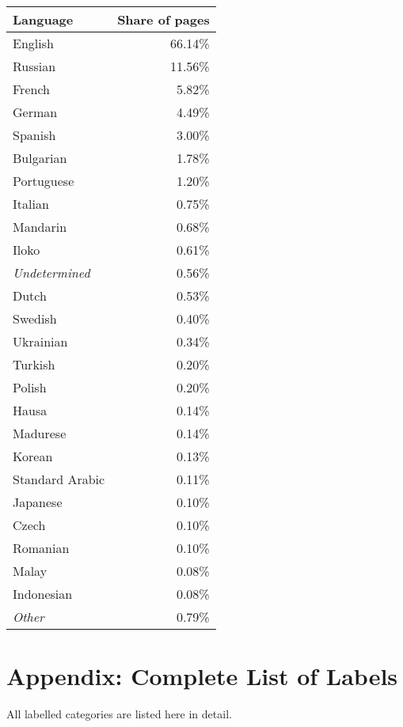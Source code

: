 \begin{center}
    \label{table:languages}
    \begin{tabular*}{\textwidth}{l@{\extracolsep{\fill}}r}
    \textbf{Language} &	\textbf{Share of pages}	\\
    \hline
    \hline
	English		&	66.14\%\\
	\hline
	Russian		&	11.56\%\\
	\hline
	French		&	5.82\%\\
	\hline
	German		&	4.49\%\\
	\hline
	Spanish		&	3.00\%\\
	\hline
	Bulgarian	&	1.78\%\\
	\hline
	Portuguese	&	1.20\%\\
	\hline
	Italian	&	0.75\%\\
	\hline
	Mandarin	&	0.68\%\\
	\hline
	Iloko		&	0.61\%\\
	\hline
	\textit{Undetermined}	&	0.56\%\\
	\hline
	Dutch		&	0.53\%\\
	\hline
	Swedish		&	0.40\%\\
	\hline
	Ukrainian	&	0.34\%\\
	\hline
	Turkish		&	0.20\%\\
	\hline
	Polish		&	0.20\%\\
	\hline
	Hausa		&	0.14\%\\
	\hline
	Madurese	&	0.14\%\\
	\hline
	Korean		&	0.13\%\\
	\hline
	Standard Arabic	&	0.11\%\\
	\hline
	Japanese	&	0.10\%\\
	\hline
	Czech		&	0.10\%\\
	\hline
	Romanian	&	0.10\%\\
	\hline
	Malay		&	0.08\%\\
	\hline
	Indonesian	&	0.08\%\\
	\hline
	\textit{Other}		&	0.79\%\\
    \end{tabular*}
\end{center}
\fi

\newpage
\section{Appendix: Complete List of Labels}
All labelled categories are listed here in detail.
